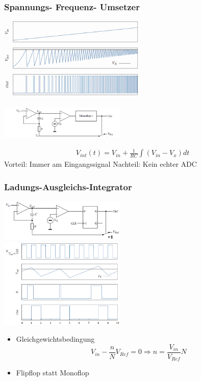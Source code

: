 \subsubsection{Spannungs- Frequenz- Umsetzer }
\begin{multicols}{2}
\setlength{\columnseprule}{1pt}
	\begin{center}
  		\includegraphics[width=7cm]{pictures/sfu_kurven}
  	\end{center}
  
  
  \includegraphics[width=6cm]{pictures/sfu_schaltung}
  
   \begin{align*}
      V_{int}(t)=V_{in}+\frac{1}{RC}\int(V_{in}-V_{x})dt
   \end{align*}
    Vorteil: Immer am Eingangssignal\newline
    Nachteil: Kein echter ADC  


\subsubsection{Ladungs-Ausgleichs-Integrator }
	\includegraphics[width=6cm, valign=t]{pictures/lsg1} \\
	\includegraphics[width=6cm, valign=t]{pictures/lsg2}
	\begin{itemize}
	   \item Gleichgewichtsbedingung\\
	    \begin{equation*}
	      V_{in}-\frac{n}{N}V_{Ref}=0\Rightarrow n=\frac{V_{in}}{V_{Ref}}N
	    \end{equation*}
	  \item Flipflop statt Monoflop
	\end{itemize}
	

\end{multicols}
